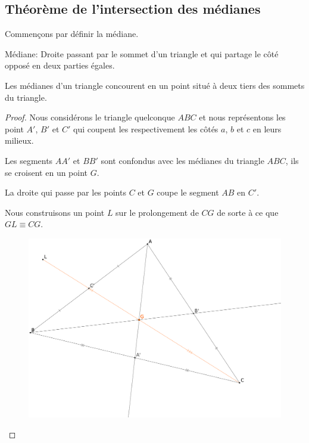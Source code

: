 \documentclass[a4paper,12pt]{article}
\begin{document}
\pagebreak
\subsection{Théorème de l'intersection des médianes}
Commençons par définir la médiane.
\begin{definition}{Médiane:}
Droite passant par le sommet d'un triangle et qui partage le côté opposé en deux parties égales.
\end{definition}

\begin{theorem}
Les médianes d'un triangle concourent en un point situé à deux tiers des sommets du triangle.
\end{theorem}

\begin{proof}
Nous considérons le triangle quelconque $ABC$ et nous représentons les point $A'$, $B'$ et $C'$ qui coupent les respectivement les côtés $a$, $b$ et $c$ en leurs milieux. 
\begin{hyp}
Les segments $AA'$ et $BB'$ sont confondus avec les médianes du triangle $ABC$, ils se croisent en un point $G$.
\end{hyp}
\begin{concl}
La droite qui passe par les points $C$ et $G$ coupe le segment $AB$ en $C'$.
\end{concl}

Nous construisons un point $L$ sur le prolongement de $CG$ de sorte à ce que $GL \equiv CG$.

\begin{figure}[H]
        \centering
        \includegraphics[scale=0.15]{mediane1.eps}
    \end{figure}


\end{proof}
\end{document}
